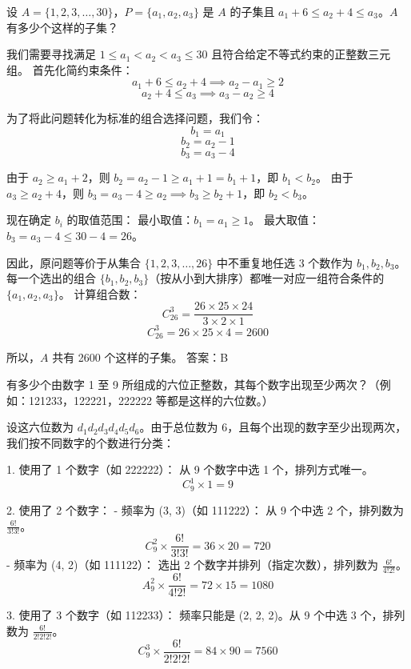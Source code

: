 \begin{questions}
\question
设 $A = \{1, 2, 3, \dots, 30\}$，$P = \{a_1, a_2, a_3\}$ 是 $A$ 的子集且 $a_1 + 6 \le a_2 + 4 \le a_3$。$A$ 有多少个这样的子集？

\begin{solution}
我们需要寻找满足 $1 \le a_1 < a_2 < a_3 \le 30$ 且符合给定不等式约束的正整数三元组。
首先化简约束条件：
\[ a_1 + 6 \le a_2 + 4 \implies a_2 - a_1 \ge 2 \]
\[ a_2 + 4 \le a_3 \implies a_3 - a_2 \ge 4 \]

为了将此问题转化为标准的组合选择问题，我们令：
\[ b_1 = a_1 \]
\[ b_2 = a_2 - 1 \]
\[ b_3 = a_3 - 4 \]

由于 $a_2 \ge a_1 + 2$，则 $b_2 = a_2 - 1 \ge a_1 + 1 = b_1 + 1$，即 $b_1 < b_2$。
由于 $a_3 \ge a_2 + 4$，则 $b_3 = a_3 - 4 \ge a_2 \implies b_3 \ge b_2 + 1$，即 $b_2 < b_3$。

现在确定 $b_i$ 的取值范围：
最小取值：$b_1 = a_1 \ge 1$。
最大取值：$b_3 = a_3 - 4 \le 30 - 4 = 26$。

因此，原问题等价于从集合 $\{1, 2, 3, \dots, 26\}$ 中不重复地任选 3 个数作为 $b_1, b_2, b_3$。
每一个选出的组合 $\{b_1, b_2, b_3\}$（按从小到大排序）都唯一对应一组符合条件的 $\{a_1, a_2, a_3\}$。
计算组合数：
\[ C_{26}^{3} = \frac{26 \times 25 \times 24}{3 \times 2 \times 1} \]
\[ C_{26}^{3} = 26 \times 25 \times 4 = 2600 \]

所以，$A$ 共有 2600 个这样的子集。
答案：B
\end{solution}

\question
有多少个由数字 1 至 9 所组成的六位正整数，其每个数字出现至少两次？（例如：121233，122221，222222 等都是这样的六位数。）

\begin{solution}
设这六位数为 $d_1 d_2 d_3 d_4 d_5 d_6$。由于总位数为 $6$，且每个出现的数字至少出现两次，我们按不同数字的个数进行分类：

1. 使用了 1 个数字（如 222222）：
   从 9 个数字中选 1 个，排列方式唯一。
   \[ C_9^1 \times 1 = 9 \]

2. 使用了 2 个数字：
   - 频率为 (3, 3)（如 111222）：
     从 9 个中选 2 个，排列数为 $\frac{6!}{3!3!}$。
     \[ C_9^2 \times \frac{6!}{3!3!} = 36 \times 20 = 720 \]
   - 频率为 (4, 2)（如 111122）：
     选出 2 个数字并排列（指定次数），排列数为 $\frac{6!}{4!2!}$。
     \[ A_9^2 \times \frac{6!}{4!2!} = 72 \times 15 = 1080 \]

3. 使用了 3 个数字（如 112233）：
   频率只能是 (2, 2, 2)。从 9 个中选 3 个，排列数为 $\frac{6!}{2!2!2!}$。
   \[ C_9^3 \times \frac{6!}{2!2!2!} = 84 \times 90 = 7560 \]


\end{solution}
\end{questions}
